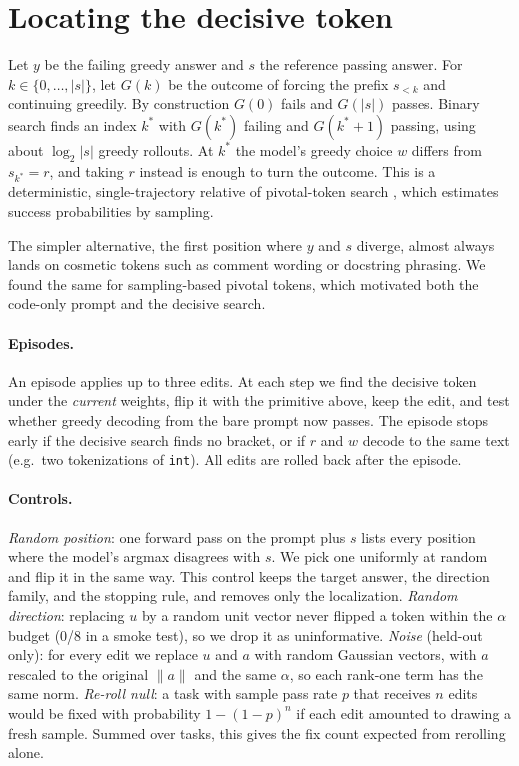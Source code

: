 \documentclass[11pt]{article}
\begin{document}
\begin{table}[t]
\centering

\caption{Pilot on the first 100 MBPP+ tasks. The denominator is greedy answers that fail the visible tests; a fix means the final answer passes the hidden suite.}
\label{tab:pilot}
\end{table}

\section{Locating the decisive token}
Let $y$ be the failing greedy answer and $s$ the reference passing answer. For $k\in\{0,\dots,|s|\}$, let $G(k)$ be the outcome of forcing the prefix $s_{<k}$ and continuing greedily. By construction $G(0)$ fails and $G(|s|)$ passes. Binary search finds an index $k^\ast$ with $G(k^\ast)$ failing and $G(k^\ast{+}1)$ passing, using about $\log_2|s|$ greedy rollouts. At $k^\ast$ the model's greedy choice $w$ differs from $s_{k^\ast}=r$, and taking $r$ instead is enough to turn the outcome. This is a deterministic, single-trajectory relative of pivotal-token search \citep{abdin2024phi4}, which estimates success probabilities by sampling.

The simpler alternative, the first position where $y$ and $s$ diverge, almost always lands on cosmetic tokens such as comment wording or docstring phrasing. We found the same for sampling-based pivotal tokens, which motivated both the code-only prompt and the decisive search.

\paragraph{Episodes.}
An episode applies up to three edits. At each step we find the decisive token under the \emph{current} weights, flip it with the primitive above, keep the edit, and test whether greedy decoding from the bare prompt now passes. The episode stops early if the decisive search finds no bracket, or if $r$ and $w$ decode to the same text (e.g.\ two tokenizations of \texttt{int}). All edits are rolled back after the episode.

\paragraph{Controls.}
\emph{Random position}: one forward pass on the prompt plus $s$ lists every position where the model's argmax disagrees with $s$. We pick one uniformly at random and flip it in the same way. This control keeps the target answer, the direction family, and the stopping rule, and removes only the localization. \emph{Random direction}: replacing $u$ by a random unit vector never flipped a token within the $\alpha$ budget (0/8 in a smoke test), so we drop it as uninformative. \emph{Noise} (held-out only): for every edit we replace $u$ and $a$ with random Gaussian vectors, with $a$ rescaled to the original $\lVert a\rVert$ and the same $\alpha$, so each rank-one term has the same norm. \emph{Re-roll null}: a task with sample pass rate $p$ that receives $n$ edits would be fixed with probability $1-(1-p)^n$ if each edit amounted to drawing a fresh sample. Summed over tasks, this gives the fix count expected from rerolling alone.
\end{document}
